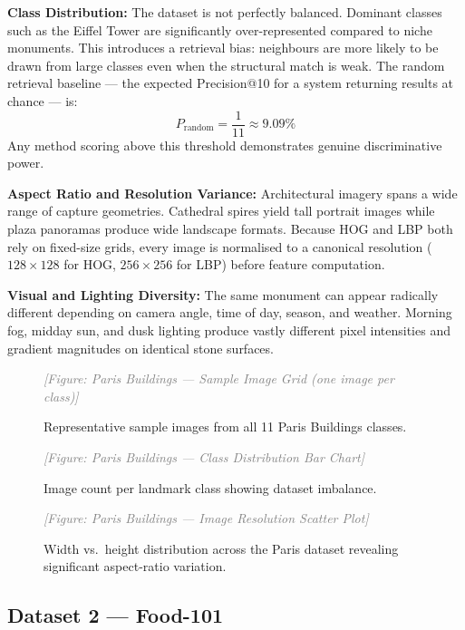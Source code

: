 \documentclass[11pt, a4paper]{article}
\newcommand{\imagebox}[2]{%
  \begin{mdframed}[backgroundcolor=gray!15, linecolor=gray!50, linewidth=1pt]
    \centering
    \vspace{#2}
    \textcolor{gray}{\textit{[Figure: #1]}}
    \vspace{#2}
  \end{mdframed}
}
\begin{document}
\textbf{Class Distribution:} The dataset is not perfectly balanced. Dominant classes such as the Eiffel Tower are significantly over-represented compared to niche monuments. This introduces a retrieval bias: neighbours are more likely to be drawn from large classes even when the structural match is weak. The random retrieval baseline — the expected Precision@10 for a system returning results at chance — is:
\[
  P_{\text{random}} = \frac{1}{11} \approx 9.09\%
\]
Any method scoring above this threshold demonstrates genuine discriminative power.

\textbf{Aspect Ratio and Resolution Variance:} Architectural imagery spans a wide range of capture geometries. Cathedral spires yield tall portrait images while plaza panoramas produce wide landscape formats. Because HOG and LBP both rely on fixed-size grids, every image is normalised to a canonical resolution ($128 \times 128$ for HOG, $256 \times 256$ for LBP) before feature computation.

\textbf{Visual and Lighting Diversity:} The same monument can appear radically different depending on camera angle, time of day, season, and weather. Morning fog, midday sun, and dusk lighting produce vastly different pixel intensities and gradient magnitudes on identical stone surfaces.

\begin{figure}[H]
  \centering
  \imagebox{Paris Buildings — Sample Image Grid (one image per class)}{1.8cm}
  \caption{Representative sample images from all 11 Paris Buildings classes.}
  \label{fig:paris_sample_grid}
\end{figure}

\begin{figure}[H]
  \centering
  \imagebox{Paris Buildings — Class Distribution Bar Chart}{1.8cm}
  \caption{Image count per landmark class showing dataset imbalance.}
  \label{fig:paris_class_dist}
\end{figure}

\begin{figure}[H]
  \centering
  \imagebox{Paris Buildings — Image Resolution Scatter Plot}{1.8cm}
  \caption{Width vs.\ height distribution across the Paris dataset revealing significant aspect-ratio variation.}
  \label{fig:paris_resolution}
\end{figure}

\subsection{Dataset 2 — Food-101}
\end{document}

